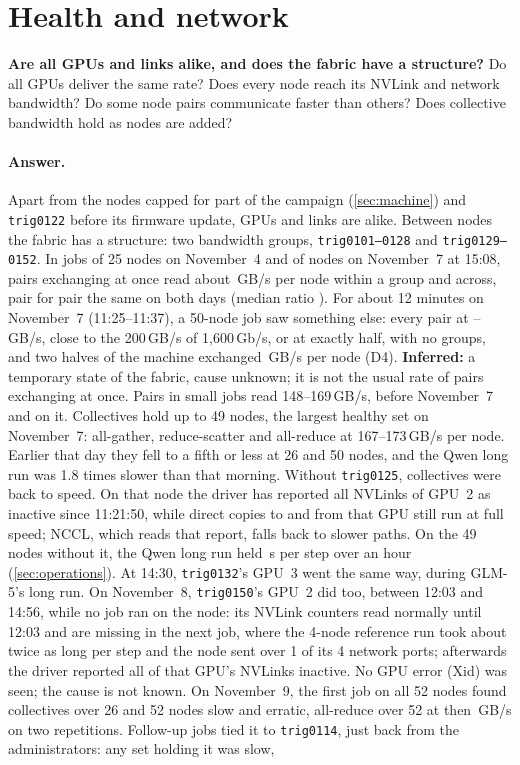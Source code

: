 \section{Health and network}
\label{sec:network}

\begin{question}
  \textbf{Are all GPUs and links alike, and does the fabric have a structure?} Do all GPUs deliver the same rate? Does every node reach its NVLink and network bandwidth? Do some node pairs
  communicate faster than others? Does collective bandwidth hold as nodes are added?
\end{question}

\paragraph{Answer.} Apart from the nodes capped for part of the campaign (\cref{sec:machine}) and \texttt{trig0122} before its firmware update, GPUs and links are alike. Between nodes the fabric has a structure: two bandwidth groups, \texttt{trig0101--0128} and \texttt{trig0129--0152}. In jobs of 25 nodes on November~4 and of \TriAgainNodes{} nodes on November~7 at 15:08, pairs exchanging at once read about \TriAgainWithin\,GB/s per node within a group and \TriAgainAcross{} across, pair for pair the same on both days (median ratio \TriAgainRatioMed). For about 12 minutes on November~7 (11:25--11:37), a 50-node job saw something else: every pair at \TriFullFastLo--\TriFullFastHi\,GB/s, close to the 200\,GB/s of 1,600\,Gb/s, or at exactly half, with no groups, and two halves of the machine exchanged \TriBisection\,GB/s per node (D4). \textbf{Inferred:} a temporary state of the fabric, cause unknown; it is not the usual rate of pairs exchanging at once. Pairs in small jobs read 148--169\,GB/s, before November~7 and on it. Collectives hold up to 49 nodes, the largest healthy set on November~7: all-gather, reduce-scatter and all-reduce at 167--173\,GB/s per node. Earlier that day they fell to a fifth or less at 26 and 50 nodes, and the Qwen long run was 1.8 times slower than that morning. Without \texttt{trig0125}, collectives were back to speed. On that node the driver has reported all NVLinks of GPU~2 as inactive since 11:21:50, while direct copies to and from that GPU still run at full speed; NCCL, which reads that report, falls back to slower paths. On the 49 nodes without it, the Qwen long run held \TriLongQStep\,s per step over an hour (\cref{sec:operations}). At 14:30, \texttt{trig0132}'s GPU~3 went the same way, during GLM-5's long run. On November~8, \texttt{trig0150}'s GPU~2 did too, between 12:03 and 14:56, while no job ran on the node: its NVLink counters read normally until 12:03 and are missing in the next job, where the 4-node reference run took about twice as long per step and the node sent over 1 of its 4 network ports; afterwards the driver reported all of that GPU's NVLinks inactive. No GPU error (Xid) was seen; the cause is not known. On November~9, the first job on all 52 nodes found collectives over 26 and 52 nodes slow and erratic, all-reduce over 52 at \TriNineReduceOne{} then \TriNineReduceTwo\,GB/s on two repetitions. Follow-up jobs tied it to \texttt{trig0114}, just back from the administrators: any set holding it was slow, 